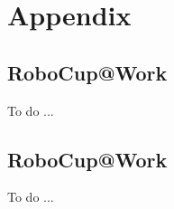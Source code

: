 \chapter{Appendix}\label{apx:appendix}

\section{RoboCup@Work}\label{apx:flexsight}
To do ...

\section{RoboCup@Work}\label{apx:robocupatwork}
To do ...